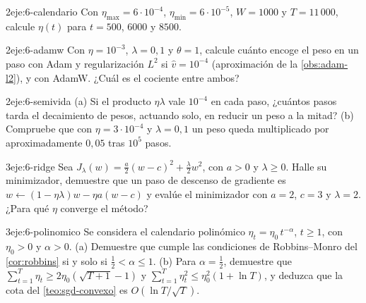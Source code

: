 \begin{ejercicio}{2}{eje:6-calendario}
Con $\eta_{\max}=6\cdot 10^{-4}$, $\eta_{\min}=6\cdot 10^{-5}$, $W=1000$ y $T=11\,000$, calcule $\eta(t)$ para $t=500$, $6000$ y $8500$.
\end{ejercicio}

\begin{ejercicio}{2}{eje:6-adamw}
Con $\eta=10^{-3}$, $\lambda=0{,}1$ y $\theta=1$, calcule cuánto encoge el peso en un paso con Adam y regularización $L^{2}$ si $\hat v=10^{-4}$ (aproximación de la \cref{obs:adam-l2}), y con AdamW. ¿Cuál es el cociente entre ambos?
\end{ejercicio}

\begin{ejercicio}{2}{eje:6-semivida}
(a) Si el producto $\eta\lambda$ vale $10^{-4}$ en cada paso, ¿cuántos pasos tarda el decaimiento de pesos, actuando solo, en reducir un peso a la mitad? (b) Compruebe que con $\eta=3\cdot 10^{-4}$ y $\lambda=0{,}1$ un peso queda multiplicado por aproximadamente $0{,}05$ tras $10^{5}$ pasos.
\end{ejercicio}

\begin{ejercicio}{3}{eje:6-ridge}
Sea $J_\lambda(w)=\frac{a}{2}(w-c)^{2}+\frac{\lambda}{2}w^{2}$, con $a>0$ y $\lambda\ge 0$. Halle su minimizador, demuestre que un paso de descenso de gradiente es $w\leftarrow(1-\eta\lambda)w-\eta a(w-c)$ y evalúe el minimizador con $a=2$, $c=3$ y $\lambda=2$. ¿Para qué $\eta$ converge el método?
\end{ejercicio}

\begin{ejercicio}{3}{eje:6-polinomico}
Se considera el calendario polinómico $\eta_t=\eta_0\,t^{-\alpha}$, $t\ge 1$, con $\eta_0>0$ y $\alpha>0$. (a) Demuestre que cumple las condiciones de Robbins--Monro del \cref{cor:robbins} si y solo si $\frac12<\alpha\le 1$. (b) Para $\alpha=\frac12$, demuestre que $\sum_{t=1}^{T}\eta_t\ge 2\eta_0(\sqrt{T+1}-1)$ y $\sum_{t=1}^{T}\eta_t^{2}\le\eta_0^{2}(1+\ln T)$, y deduzca que la cota del \cref{teo:sgd-convexo} es $O(\ln T/\sqrt T)$.
\end{ejercicio}
